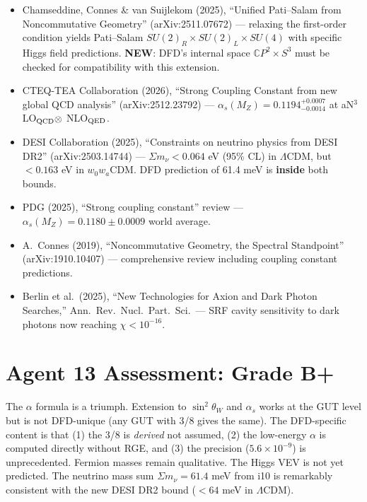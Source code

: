 \documentclass[11pt,a4paper]{article}
\newcommand{\NEW}{\textcolor{dfdblue}{\textbf{NEW}}}
\newcommand{\CP}{\mathbb{C}P}
\begin{document}
\begin{itemize}
\item Chamseddine, Connes \& van Suijlekom (2025), ``Unified Pati--Salam from Noncommutative Geometry'' (arXiv:2511.07672) --- relaxing the first-order condition yields Pati--Salam $SU(2)_R \times SU(2)_L \times SU(4)$ with specific Higgs field predictions. \NEW{}: DFD's internal space $\CP^2 \times S^3$ must be checked for compatibility with this extension.
\item CTEQ-TEA Collaboration (2026), ``Strong Coupling Constant from new global QCD analysis'' (arXiv:2512.23792) --- $\alpha_s(M_Z) = 0.1194^{+0.0007}_{-0.0014}$ at aN$^3$LO$_{\rm QCD} \otimes$ NLO$_{\rm QED}$.
\item DESI Collaboration (2025), ``Constraints on neutrino physics from DESI DR2'' (arXiv:2503.14744) --- $\Sigma m_\nu < 0.064$ eV (95\% CL) in $\Lambda$CDM, but $< 0.163$ eV in $w_0w_a$CDM. DFD prediction of 61.4 meV is \textbf{inside} both bounds.
\item PDG (2025), ``Strong coupling constant'' review --- $\alpha_s(M_Z) = 0.1180 \pm 0.0009$ world average.
\item A.\ Connes (2019), ``Noncommutative Geometry, the Spectral Standpoint'' (arXiv:1910.10407) --- comprehensive review including coupling constant predictions.
\item Berlin et al.\ (2025), ``New Technologies for Axion and Dark Photon Searches,'' Ann.\ Rev.\ Nucl.\ Part.\ Sci.\ --- SRF cavity sensitivity to dark photons now reaching $\chi < 10^{-16}$.
\end{itemize}

\section{Agent 13 Assessment: Grade B+}

The $\alpha$ formula is a triumph. Extension to $\sin^2\theta_W$ and $\alpha_s$ works at the GUT level but is not DFD-unique (any GUT with 3/8 gives the same). The DFD-specific content is that (1) the 3/8 is \emph{derived} not assumed, (2) the low-energy $\alpha$ is computed directly without RGE, and (3) the precision ($5.6 \times 10^{-9}$) is unprecedented. Fermion masses remain qualitative. The Higgs VEV is not yet predicted. The neutrino mass sum $\Sigma m_\nu = 61.4$ meV from i10 is remarkably consistent with the new DESI DR2 bound ($< 64$ meV in $\Lambda$CDM).
\end{document}
